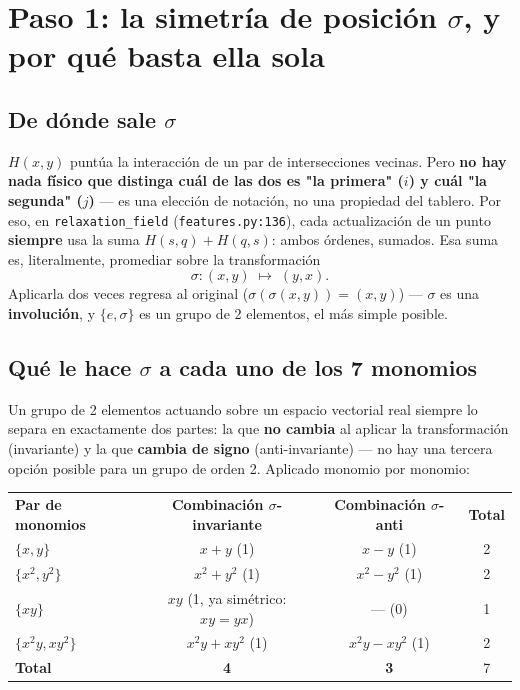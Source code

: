 \documentclass[11pt, a4paper]{article}
\newcommand{\TH}[1]{\cellcolor{cTHbg}\color{white}\textbf{#1}}
\newcommand{\good}[1]{\color{cGood}\textbf{#1}}
\newcommand{\bad}[1]{\color{cBad}\textbf{#1}}
\begin{document}
\section{Paso 1: la simetr\'ia de posici\'on $\sigma$, y por qu\'e basta ella sola}
\label{sec:sigma}

\subsection{De d\'onde sale $\sigma$}

$H(x,y)$ punt\'ua la interacci\'on de un par de intersecciones
vecinas. Pero \textbf{no hay nada f\'isico que distinga cu\'al de las
dos es "la primera" ($i$) y cu\'al "la segunda" ($j$)} --- es una
elecci\'on de notaci\'on, no una propiedad del tablero. Por eso, en
\texttt{relaxation\_field} (\texttt{features.py:136}), cada
actualizaci\'on de un punto \textbf{siempre} usa la suma
$H(s,q)+H(q,s)$: ambos \'ordenes, sumados. Esa suma es, literalmente,
promediar sobre la transformaci\'on
\[
\sigma: (x,y) \;\longmapsto\; (y,x).
\]
Aplicarla dos veces regresa al original ($\sigma(\sigma(x,y))=(x,y)$)
--- $\sigma$ es una \textbf{involuci\'on}, y $\{e,\sigma\}$ es un
grupo de 2 elementos, el m\'as simple posible.

\subsection{Qu\'e le hace $\sigma$ a cada uno de los 7 monomios}

Un grupo de 2 elementos actuando sobre un espacio vectorial real
siempre lo separa en exactamente dos partes: la que \textbf{no cambia}
al aplicar la transformaci\'on (invariante) y la que \textbf{cambia de
signo} (anti-invariante) --- no hay una tercera opci\'on posible para
un grupo de orden 2. Aplicado monomio por monomio:

\medskip
\begin{center}
\begin{tabular}{lccc}
  \TH{Par de monomios} & \TH{Combinaci\'on $\sigma$-invariante} & \TH{Combinaci\'on $\sigma$-anti} & \TH{Total} \\[1pt]
  $\{x,y\}$       & $x{+}y$ (1)             & $x{-}y$ (1)     & 2 \\
  $\{x^2,y^2\}$   & $x^2{+}y^2$ (1)         & $x^2{-}y^2$ (1) & 2 \\
  $\{xy\}$        & $xy$ (1, ya sim\'etrico: $xy=yx$) & --- (0) & 1 \\
  $\{x^2y,xy^2\}$ & $x^2y{+}xy^2$ (1)       & $x^2y{-}xy^2$ (1) & 2 \\
  \hline
  \TH{Total} & \good{4} & \bad{3} & 7 \\
\end{tabular}
\end{center}
\medskip
\end{document}
